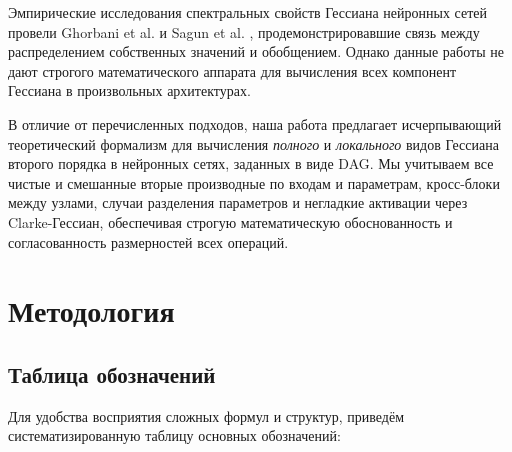 \documentclass[11pt]{article}
\begin{document}
Эмпирические исследования спектральных свойств Гессиана нейронных сетей провели
Ghorbani et al. \citep{ghorbani2019investigation} и Sagun et al.
\citep{sagun2017empirical}, продемонстрировавшие связь между распределением собственных
значений и обобщением. Однако данные работы не дают строгого математического аппарата для
вычисления всех компонент Гессиана в произвольных архитектурах.

В отличие от перечисленных подходов, наша работа предлагает исчерпывающий теоретический
формализм для вычисления \emph{полного} и \emph{локального} видов Гессиана второго порядка в нейронных
сетях, заданных в виде DAG. Мы учитываем все чистые и смешанные вторые производные по входам и параметрам,
кросс-блоки между узлами, случаи разделения параметров и негладкие активации через Clarke-Гессиан,
обеспечивая строгую математическую обоснованность и согласованность размерностей всех операций.

\section{Методология}

\subsection{Таблица обозначений}

Для удобства восприятия сложных формул и структур, приведём систематизированную таблицу основных обозначений:
\end{document}
